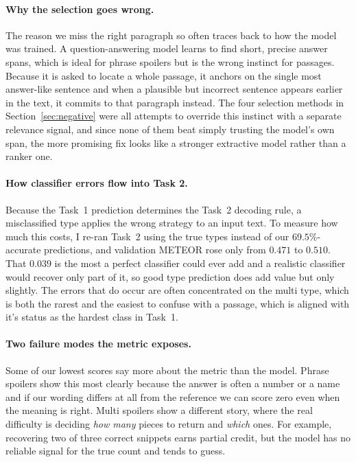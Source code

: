 \documentclass[11pt]{article}
\begin{document}
\paragraph{Why the selection goes wrong.}
The reason we miss the right paragraph so often traces back to how the model was
trained. A question-answering model learns to find short, precise answer spans,
which is ideal for phrase spoilers but is the wrong instinct for passages. Because it is asked
to locate a whole passage, it anchors on the single most answer-like sentence and
when a plausible but incorrect sentence appears earlier in the text, it commits
to that paragraph instead. The four selection methods in
Section~\ref{sec:negative} were all attempts to override this instinct with a
separate relevance signal, and since none of them beat simply trusting the model's
own span, the more promising fix looks like a stronger extractive model rather
than a ranker one.

\paragraph{How classifier errors flow into Task 2.}
Because the Task~1 prediction determines the Task~2 decoding rule, a misclassified
type applies the wrong strategy to an input text. To measure how much this costs, I
re-ran Task~2 using the true types instead of our $69.5\%$-accurate
predictions, and validation METEOR rose only from $0.471$ to $0.510$. That
$0.039$ is the most a perfect classifier could ever add and a realistic
classifier would recover only part of it, so good type prediction does add value but only slightly. The errors that do occur are often concentrated on the multi type,
which is both the rarest and the easiest to confuse with a passage, which is aligned with it's
status as the hardest class in Task~1.

\paragraph{Two failure modes the metric exposes.}
Some of our lowest scores say more about the metric than the model. Phrase
spoilers show this most clearly because the answer is often a number or a name and if
our wording differs at all from the reference we can score zero even when the
meaning is right. Multi spoilers show a different story, where the real difficulty
is deciding \textit{how many} pieces to return and \textit{which} ones. For example, recovering
two of three correct snippets earns partial credit, but the model has no reliable
signal for the true count and tends to guess.
\end{document}
